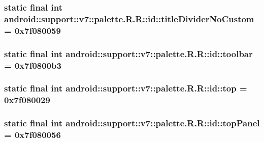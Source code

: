 \hypertarget{classandroid_1_1support_1_1v7_1_1palette_1_1_r_1_1id_dbf1dbab190439ec044d991c2501334f}{
\subsubsection[{titleDividerNoCustom}]{\setlength{\rightskip}{0pt plus 5cm}static final int android::support::v7::palette.R.R::id::titleDividerNoCustom = 0x7f080059}}
\label{classandroid_1_1support_1_1v7_1_1palette_1_1_r_1_1id_dbf1dbab190439ec044d991c2501334f}


\hypertarget{classandroid_1_1support_1_1v7_1_1palette_1_1_r_1_1id_6d61d2188ef854e0a44e56286b867eb2}{
\subsubsection[{toolbar}]{\setlength{\rightskip}{0pt plus 5cm}static final int android::support::v7::palette.R.R::id::toolbar = 0x7f0800b3}}
\label{classandroid_1_1support_1_1v7_1_1palette_1_1_r_1_1id_6d61d2188ef854e0a44e56286b867eb2}


\hypertarget{classandroid_1_1support_1_1v7_1_1palette_1_1_r_1_1id_bfdb040bee85caed7b73d0920e1ab655}{
\subsubsection[{top}]{\setlength{\rightskip}{0pt plus 5cm}static final int android::support::v7::palette.R.R::id::top = 0x7f080029}}
\label{classandroid_1_1support_1_1v7_1_1palette_1_1_r_1_1id_bfdb040bee85caed7b73d0920e1ab655}


\hypertarget{classandroid_1_1support_1_1v7_1_1palette_1_1_r_1_1id_ed135b4a38a1395e2836711a57e4476b}{
\subsubsection[{topPanel}]{\setlength{\rightskip}{0pt plus 5cm}static final int android::support::v7::palette.R.R::id::topPanel = 0x7f080056}}
\label{classandroid_1_1support_1_1v7_1_1palette_1_1_r_1_1id_ed135b4a38a1395e2836711a57e4476b}


